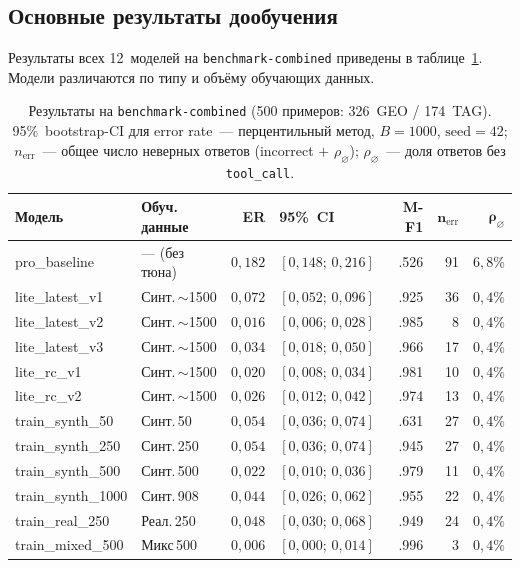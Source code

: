 \subsection{Основные результаты дообучения} \label{subsec:main_results}

Результаты всех 12~моделей на \texttt{benchmark-combined} приведены в таблице~\ref{tab:combined_results}. Модели различаются по типу и объёму обучающих данных.

\begin{table}[H]
\centering
\caption{Результаты на \texttt{benchmark-combined} (500 примеров: 326~GEO / 174~TAG). 95\%~bootstrap-CI для error rate~--- перцентильный метод, $B = 1000$, $\mathrm{seed} = 42$; $n_\mathrm{err}$~--- общее число неверных ответов (incorrect $+$ $\rho_\varnothing$); $\rho_\varnothing$~--- доля ответов без \texttt{tool\_call}.}
\label{tab:combined_results}
\def\arraystretch{1.15}
\setlength\tabcolsep{0.25em}
{\small
\begin{tabular}{l l r l r r r}
    \toprule
    \textbf{Модель} & \textbf{Обуч. данные} & \textbf{ER} & \textbf{95\%~CI} & \textbf{M-F1} & $\boldsymbol{n_\mathrm{err}}$ & $\boldsymbol{\rho_\varnothing}$ \\
    \midrule
    pro\_baseline       & --- (без тюна)    & $0{,}182$ & $[0{,}148;\,0{,}216]$ & .526 & 91 & $6{,}8\%$ \\
    \midrule
    lite\_latest\_v1    & Синт.\,${\sim}$1500 & $0{,}072$ & $[0{,}052;\,0{,}096]$ & .925 & 36 & $0{,}4\%$ \\
    lite\_latest\_v2    & Синт.\,${\sim}$1500 & $0{,}016$ & $[0{,}006;\,0{,}028]$ & .985 &  8 & $0{,}4\%$ \\
    lite\_latest\_v3    & Синт.\,${\sim}$1500 & $0{,}034$ & $[0{,}018;\,0{,}050]$ & .966 & 17 & $0{,}4\%$ \\
    \midrule
    lite\_rc\_v1        & Синт.\,${\sim}$1500 & $0{,}020$ & $[0{,}008;\,0{,}034]$ & .981 & 10 & $0{,}4\%$ \\
    lite\_rc\_v2        & Синт.\,${\sim}$1500 & $0{,}026$ & $[0{,}012;\,0{,}042]$ & .974 & 13 & $0{,}4\%$ \\
    \midrule
    train\_synth\_50    & Синт.\,50        & $0{,}054$ & $[0{,}036;\,0{,}074]$ & .631 & 27 & $0{,}4\%$ \\
    train\_synth\_250   & Синт.\,250       & $0{,}054$ & $[0{,}036;\,0{,}074]$ & .945 & 27 & $0{,}4\%$ \\
    train\_synth\_500   & Синт.\,500       & $0{,}022$ & $[0{,}010;\,0{,}036]$ & .979 & 11 & $0{,}4\%$ \\
    train\_synth\_1000  & Синт.\,908       & $0{,}044$ & $[0{,}026;\,0{,}062]$ & .955 & 22 & $0{,}4\%$ \\
    \midrule
    train\_real\_250    & Реал.\,250         & $0{,}048$ & $[0{,}030;\,0{,}068]$ & .949 & 24 & $0{,}4\%$ \\
    train\_mixed\_500   & Микс\,500          & $0{,}006$ & $[0{,}000;\,0{,}014]$ & .996 &  3 & $0{,}4\%$ \\
    \bottomrule
\end{tabular}
}
\end{table}

